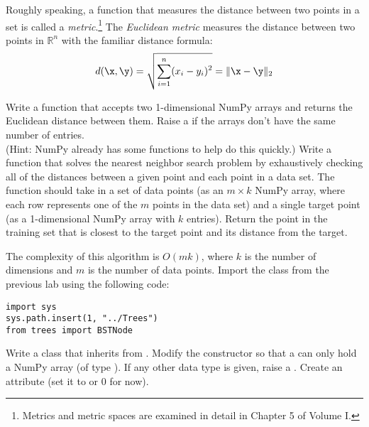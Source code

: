 Roughly speaking, a function that measures the distance between two points in a set is called a \emph{metric}.\footnote{Metrics and metric spaces are examined in detail in Chapter 5 of Volume I.}
The \emph{Euclidean metric} measures the distance between two points in $\mathbb{R}^n$ with the familiar distance formula:
\[
d(\x,\y) = \sqrt{\displaystyle\sum_{i=1}^n (x_i - y_i)^2} = \| \x - \y \|_2
\]

Write a function that accepts two 1-dimensional NumPy arrays and returns the Euclidean distance between them.
Raise a  if the arrays don't have the same number of entries.
\\
(Hint: NumPy already has some functions to help do this quickly.)
Write a function that solves the nearest neighbor search problem by exhaustively checking all of the distances between a given point and each point in a data set.
The function should take in a set of data points (as an $m \times k$ NumPy array, where each row represents one of the $m$ points in the data set) and a single target point (as a 1-dimensional NumPy array with $k$ entries).
Return the point in the training set that is closest to the target point and its distance from the target.

The complexity of this algorithm is $O(mk)$, where $k$ is the number of dimensions and $m$ is the number of data points.
Import the  class from the previous lab using the following code:
\begin{lstlisting}
import sys
sys.path.insert(1, "../Trees")
from trees import BSTNode
\end{lstlisting}
Write a  class that inherits from .
Modify the constructor so that a  can only hold a NumPy array (of type ).
If any other data type is given, raise a .
Create an  attribute (set it to  or $0$ for now).

